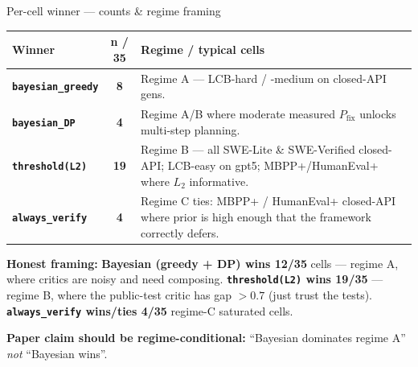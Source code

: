 \documentclass[10pt]{beamer}
\newcommand{\good}[1]{\textcolor{accentGreen}{\textbf{#1}}}
\newcommand{\warn}[1]{\textcolor{accentOrange}{\textbf{#1}}}
\begin{document}
\begin{frame}{Per-cell winner --- counts \& regime framing}
\vspace{0.15cm}
\begin{table}
\centering
\renewcommand{\arraystretch}{1.18}
\begin{tabular}{>{\bfseries}lcp{6.8cm}}
\toprule
\rowcolor{paleBlue}
\textbf{Winner} & \textbf{n / 35} & \textbf{Regime / typical cells} \\
\midrule
\rowcolor{paleGreen}
\good{\texttt{bayesian\_greedy}} & \textbf{8}
  & {\footnotesize Regime A --- LCB-hard / -medium on closed-API gens.} \\
\addlinespace[1pt]
\rowcolor{paleGreen}
\good{\texttt{bayesian\_DP}} & \textbf{4}
  & {\footnotesize Regime A/B where moderate measured $P_{\text{fix}}$ unlocks multi-step planning.} \\
\addlinespace[2pt]
\warn{\texttt{threshold(L2)}} & \textbf{19}
  & {\footnotesize Regime B --- all SWE-Lite \& SWE-Verified closed-API; LCB-easy on gpt5; MBPP+/HumanEval+ where $L_2$ informative.} \\
\addlinespace[1pt]
\textbf{\texttt{always\_verify}} & \textbf{4}
  & {\footnotesize Regime C ties: MBPP+ / HumanEval+ closed-API where prior is high enough that the framework correctly defers.} \\
\bottomrule
\end{tabular}
\end{table}

\vspace{0.2cm}
{\footnotesize
\good{\textbf{Honest framing:}}
\textbf{Bayesian (greedy + DP) wins 12/35} cells --- regime A, where critics
are noisy and need composing. \textbf{\texttt{threshold(L2)} wins 19/35} ---
regime B, where the public-test critic has gap $> 0.7$ (just trust the tests).
\textbf{\texttt{always\_verify} wins/ties 4/35} regime-C saturated cells.

\warn{Paper claim should be regime-conditional:} ``Bayesian dominates regime A''
\emph{not} ``Bayesian wins''.}
\end{frame}
\end{document}
